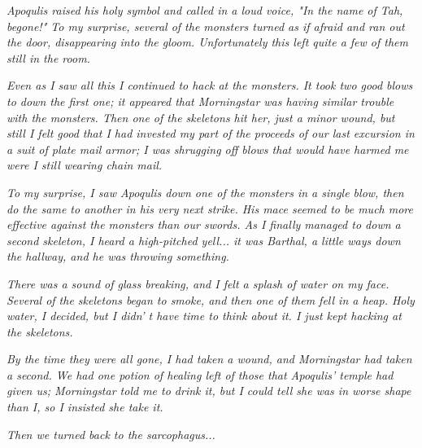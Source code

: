 \documentclass[a4paper,twoside,openany,10pt]{book}
\begin{document}
\textit{Apoqulis raised his holy symbol and called in a loud voice, "In the name of Tah, begone!" To my surprise, several of the monsters turned as if afraid and ran out the door, disappearing into the gloom. Unfortunately this left quite a few of them still in the room.}

\textit{Even as I saw all this I continued to hack at the monsters. It took two good blows to down the first one; it appeared that Morningstar was having similar trouble with the monsters. Then one of the skeletons hit her, just a minor wound, but still I felt good that I had invested my part of the proceeds of our last excursion in a suit of plate mail armor; I was shrugging off blows that would have harmed me were I still wearing chain mail.}

\textit{To my surprise, I saw Apoqulis down one of the monsters in a single blow, then do the same to another in his very next strike. His mace seemed to be much more effective against the monsters than our swords. As I finally managed to down a second skeleton, I heard a high-pitched yell... it was Barthal, a little ways down the hallway, and he was throwing something.}

\textit{There was a sound of glass breaking, and I felt a splash of water on my face. Several of the skeletons began to smoke, and then one of them fell in a heap. Holy water, I decided, but I didn' t have time to think about it. I just kept hacking at the skeletons.}

\textit{By the time they were all gone, I had taken a wound, and Morningstar had taken a second. We had one potion of healing left of those that Apoqulis' temple had given us; Morningstar told me to drink it, but I could tell she was in worse shape than I, so I insisted she take it.}

\textit{Then we turned back to the sarcophagus...}
\end{document}

